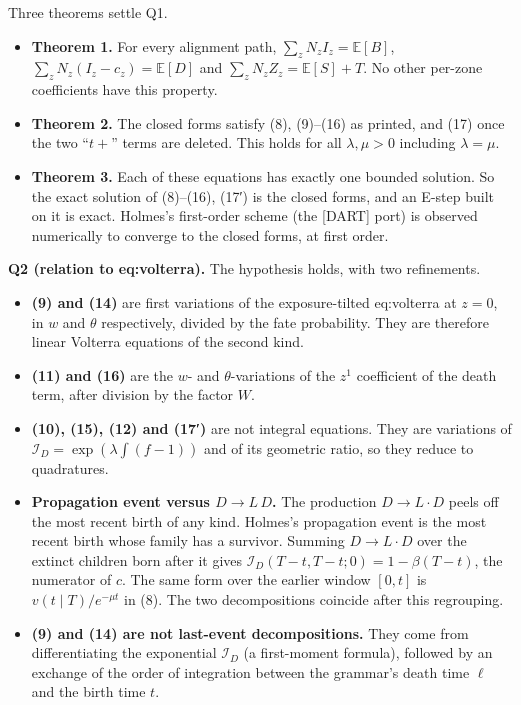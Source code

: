 \documentclass[10pt,]{article}
\providecommand{\tightlist}{%
  \setlength{\itemsep}{0pt}\setlength{\parskip}{0pt}}
\begin{document}
Three theorems settle Q1.

\begin{itemize}
\tightlist
\item
  \textbf{Theorem 1.} For every alignment path,
  \(\sum_zN_zI_z=\mathbb E[B]\), \(\sum_zN_z(I_z-c_z)=\mathbb E[D]\) and
  \(\sum_zN_zZ_z=\mathbb E[S]+T\). No other per-zone coefficients have
  this property.
\item
  \textbf{Theorem 2.} The closed forms satisfy (8), (9)--(16) as
  printed, and (17) once the two ``\(t+\)'' terms are deleted. This
  holds for all \(\lambda,\mu>0\) including \(\lambda=\mu\).
\item
  \textbf{Theorem 3.} Each of these equations has exactly one bounded
  solution. So the exact solution of (8)--(16), (17′) is the closed
  forms, and an E-step built on it is exact. Holmes's first-order scheme
  (the {[}DART{]} port) is observed numerically to converge to the
  closed forms, at first order.
\end{itemize}

\textbf{Q2 (relation to eq:volterra).} The hypothesis holds, with two
refinements.

\begin{itemize}
\tightlist
\item
  \textbf{(9) and (14)} are first variations of the exposure-tilted
  eq:volterra at \(z=0\), in \(w\) and \(\theta\) respectively, divided
  by the fate probability. They are therefore linear Volterra equations
  of the second kind.
\item
  \textbf{(11) and (16)} are the \(w\)- and \(\theta\)-variations of the
  \(z^1\) coefficient of the death term, after division by the factor
  \(W\).
\item
  \textbf{(10), (15), (12) and (17′)} are not integral equations. They
  are variations of \(\mathcal I_D=\exp(\lambda\int(f-1))\) and of its
  geometric ratio, so they reduce to quadratures.
\item
  \textbf{Propagation event versus \(D\to L\,D\).} The production
  \(D\to L\cdot D\) peels off the most recent birth of any kind.
  Holmes's propagation event is the most recent birth whose family has a
  survivor. Summing \(D\to L\cdot D\) over the extinct children born
  after it gives \(\mathcal I_D(T-t,T-t;0)=1-\beta(T-t)\), the numerator
  of \(c\). The same form over the earlier window \([0,t]\) is
  \(v(t\mid T)/e^{-\mu t}\) in (8). The two decompositions coincide
  after this regrouping.
\item
  \textbf{(9) and (14) are not last-event decompositions.} They come
  from differentiating the exponential \(\mathcal I_D\) (a first-moment
  formula), followed by an exchange of the order of integration between
  the grammar's death time \(\ell\) and the birth time \(t\).
\end{itemize}
\end{document}
